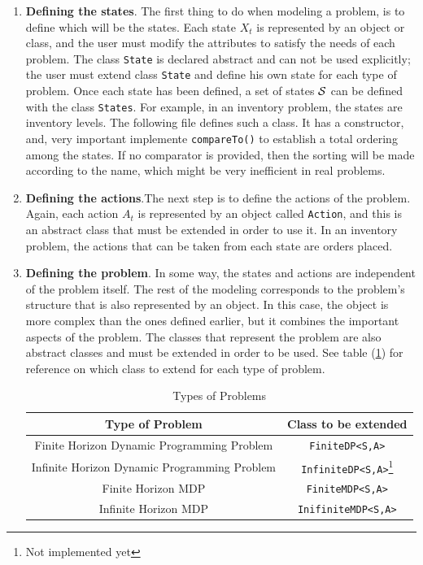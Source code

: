 \documentclass[11pt]{article}
\newcommand {\cA}{\ensuremath \mathcal{A}}
\newcommand {\cS}{\ensuremath \mathcal{S}}
\newcommand {\lil}{\lstinline}
\newcommand{\lstinclude}[1]{
	
}
\begin{document}
\begin{enumerate}
  \item \textbf{Defining the states}. The first thing to do when modeling a problem, is to define which will be the states. Each state $X_t$ is represented by an object or class, and the user must modify the attributes to satisfy the needs of each problem. The class \lstinline!State! is declared abstract and can not be used explicitly; the user must extend class \lstinline!State! and define his own state for each type of problem. Once each state has been defined, a set of states $\cS$ can be defined with the class \lstinline!States!. For example, in an inventory problem, the states are inventory levels. The following file defines such a class. It has a constructor, and, very important implemente \lil!compareTo()! to establish a total ordering among the states. If no comparator is provided, then the sorting will be made according to the name, which might be very inefficient in real problems.

\lstinclude{InvLevel.java}



\item \textbf{Defining the actions}.The next step is to define the actions of the problem. Again, each action $A_t$ is represented by an object called \lstinline!Action!, and this is an abstract class that must be extended in order to use it. In an inventory problem, the actions that can be taken from each state are orders placed. %

\lstinclude{Order.java}

\item \textbf{Defining the problem}. In some way, the states and actions are independent of the problem itself. The rest of the modeling corresponds to the problem's structure that is also represented by an object. In this case, the object is more complex than the ones defined earlier, but it combines the important aspects of the problem. The classes that represent the problem are also abstract classes and must be extended in order to be used. See table (\ref{tab:TypesOfProblems}) for reference on which class to extend for each type of problem.

\begin{table}[ht]
  \centering
    \begin{tabular}{|c|c|}
      \hline
      Type of Problem & Class to be extended\\
      \hline
      Finite Horizon Dynamic Programming Problem & \lstinline!FiniteDP<S,A>!\\
      Infinite Horizon Dynamic Programming Problem & \lstinline!InfiniteDP<S,A>!\footnote{Not implemented yet}\\
      Finite Horizon MDP & \lstinline!FiniteMDP<S,A>!\\
      Infinite Horizon MDP & \lstinline!InifiniteMDP<S,A>!\\
      \hline
    \end{tabular}
  \caption{Types of Problems}
  \label{tab:TypesOfProblems}
\end{table}


\end{enumerate}
\end{document}
